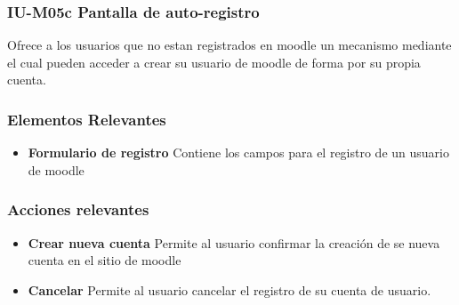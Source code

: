 
\subsubsection{IU-M05c Pantalla de auto-registro}

 Ofrece a los usuarios que no estan registrados en moodle un mecanismo mediante
 el cual pueden acceder a crear su usuario de moodle de forma por su propia cuenta.


\subsubsection{Elementos Relevantes}

    \begin{itemize}
    \item {\bf Formulario de registro}
        Contiene los campos para el registro de un usuario de moodle
    \end{itemize}

\subsubsection{Acciones relevantes}

    \begin{itemize}
    \item {\bf Crear nueva cuenta}
        Permite al usuario confirmar la creación de se nueva cuenta en el
        sitio de moodle

    \item {\bf Cancelar}
        Permite al usuario cancelar el registro de su cuenta de usuario.
    \end{itemize}

\clearpage
